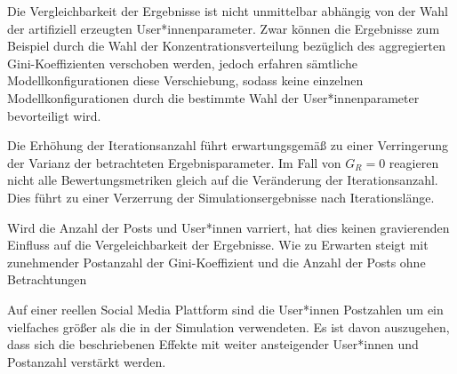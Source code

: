 Die Vergleichbarkeit der Ergebnisse ist nicht unmittelbar abhängig von der Wahl der artifiziell erzeugten User*innenparameter. Zwar können die Ergebnisse zum Beispiel durch die Wahl der Konzentrationsverteilung bezüglich des aggregierten Gini-Koeffizienten verschoben werden, jedoch erfahren sämtliche Modellkonfigurationen diese Verschiebung, sodass keine einzelnen Modellkonfigurationen durch die bestimmte Wahl der User*innenparameter bevorteiligt wird.


Die Erhöhung der Iterationsanzahl führt erwartungsgemäß zu einer Verringerung der Varianz der betrachteten Ergebnisparameter. Im Fall von $G_R = 0$ reagieren nicht alle Bewertungsmetriken gleich auf die Veränderung der Iterationsanzahl. Dies führt zu einer Verzerrung der Simulationsergebnisse nach Iterationslänge.

Wird die Anzahl der Posts und User*innen varriert, hat dies keinen gravierenden Einfluss auf die Vergeleichbarkeit der Ergebnisse. Wie zu Erwarten steigt mit zunehmender Postanzahl der Gini-Koeffizient und die Anzahl der Posts ohne Betrachtungen

Auf einer reellen Social Media Plattform sind die User*innen Postzahlen um ein vielfaches größer als die in der Simulation verwendeten. Es ist davon auszugehen, dass sich die beschriebenen Effekte mit weiter ansteigender User*innen und Postanzahl verstärkt werden. 
